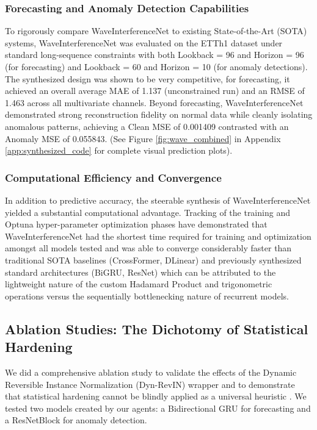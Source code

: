 \documentclass{article}
\begin{document}
\subsubsection{Forecasting and Anomaly Detection Capabilities}
\label{subsubsec:uncon}
To rigorously compare WaveInterferenceNet to existing State-of-the-Art (SOTA) systems, WaveInterferenceNet was evaluated on the ETTh1 dataset under standard long-sequence constraints with both Lookback = 96 and Horizon = 96 (for forecasting) and Lookback = 60 and Horizon = 10 (for anomaly detections). The synthesized design was shown to be very competitive, for forecasting, it achieved an overall average MAE of 1.137 (unconstrained run) and an RMSE of 1.463 across all multivariate channels. Beyond forecasting, WaveInterferenceNet demonstrated strong reconstruction fidelity on normal data while cleanly isolating anomalous patterns, achieving a Clean MSE of 0.001409 contrasted with an Anomaly MSE of 0.055843. (See Figure \ref{fig:wave_combined} in Appendix \ref{app:synthesized_code} for complete visual prediction plots).

\subsubsection{Computational Efficiency and Convergence}
In addition to predictive accuracy, the steerable synthesis of WaveInterferenceNet yielded a substantial computational advantage. Tracking of the training and Optuna hyper-parameter optimization phases have demonstrated that WaveInterferenceNet had the shortest time required for training and optimization amongst all models tested and was able to converge considerably faster than traditional SOTA baselines (CrossFormer, DLinear) and previously synthesized standard architectures (BiGRU, ResNet) which can be attributed to the lightweight nature of the custom Hadamard Product and trigonometric operations versus the sequentially bottlenecking nature of recurrent models.

\subsection{Ablation Studies: The Dichotomy of Statistical Hardening}
\label{sec:ablation}

We did a comprehensive ablation study to validate the effects of the Dynamic Reversible Instance Normalization (Dyn-RevIN) wrapper and to demonstrate that statistical hardening cannot be blindly applied as a universal heuristic \cite{kim2022reversible}. We tested two models created by our agents: a Bidirectional GRU for forecasting and a ResNetBlock for anomaly detection.
\end{document}
